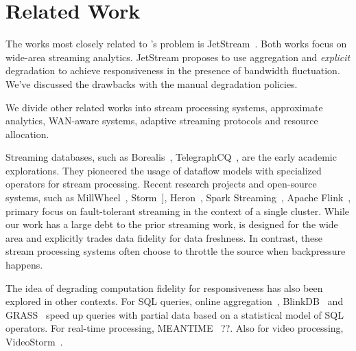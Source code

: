 \section{Related Work}
\label{sec:related-work}


The works most closely related to \sysname{}'s problem
is JetStream~\cite{rabkin2014aggregation}. Both works focus on wide-area
streaming analytics. JetStream proposes to use aggregation and \textit{explicit}
degradation to achieve responsiveness in the presence of bandwidth fluctuation.
We've discussed the drawbacks with the manual degradation policies.

We divide other related works into stream processing systems, approximate
analytics, WAN-aware systems, adaptive streaming protocols and resource
allocation.

 Streaming databases, such as
Borealis~\cite{abadi2005design},
TelegraphCQ~\cite{chandrasekaran2003telegraphcq}, are the early academic
explorations. They pioneered the usage of dataflow models with specialized
operators for stream processing. Recent research projects and open-source
systems, such as MillWheel~\cite{akidau2013millwheel},
Storm~\cite{toshniwal2014storm}], Heron~\cite{sanjeev2015twitter}, Spark
Streaming~\cite{zaharia2013discretized}, Apache Flink~\cite{carbone2015apache},
primary focus on fault-tolerant streaming in the context of a single
cluster. While our work has a large debt to the prior streaming work, \sysname{}
is designed for the wide area and explicitly trades data fidelity for data
freshness. In contrast, these stream processing systems often choose to throttle
the source when backpressure happens.

 The idea of degrading computation fidelity for
responsiveness has also been explored in other contexts. For SQL queries, online
aggregation~\cite{hellerstein1997online}, BlinkDB~\cite{agarwal2013blinkdb} and
GRASS~\cite{ananthanarayanan2014grass} speed up queries with partial data based
on a statistical model of SQL operators. For real-time processing,
MEANTIME~\cite{farrell2016meantime} ??. Also for video processing,
VideoStorm~\cite{zhang2017live}.

